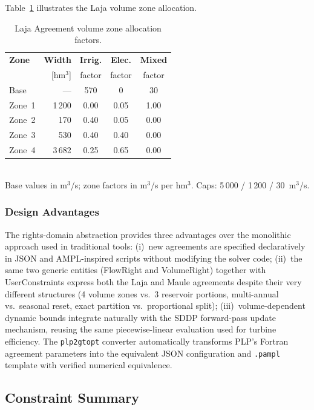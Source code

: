 Table~\ref{tab:laja_zones} illustrates the Laja volume zone
allocation.

\begin{table}[t]
\centering
\caption{Laja Agreement volume zone allocation factors.}
\label{tab:laja_zones}
\small
\begin{tabular}{@{}lrccc@{}}
\toprule
\textbf{Zone} & \textbf{Width} & \textbf{Irrig.}
  & \textbf{Elec.} & \textbf{Mixed} \\
  & [hm$^3$] & factor & factor & factor \\
\midrule
Base       & ---     & 570    & 0      & 30   \\
Zone~1     & 1\,200  & 0.00   & 0.05   & 1.00 \\
Zone~2     & 170     & 0.40   & 0.05   & 0.00 \\
Zone~3     & 530     & 0.40   & 0.40   & 0.00 \\
Zone~4     & 3\,682  & 0.25   & 0.65   & 0.00 \\
\bottomrule
\end{tabular}
\\[4pt]
{\footnotesize Base values in m$^3$/s; zone factors in
m$^3$/s per hm$^3$.  Caps: 5\,000 / 1\,200 / 30~m$^3$/s.}
\end{table}

\subsubsection{Design Advantages}

The rights-domain abstraction provides three advantages over the
monolithic approach used in traditional tools: (i)~new agreements are
specified declaratively in JSON and AMPL-inspired scripts without
modifying the solver code; (ii)~the same two generic entities
(FlowRight and VolumeRight) together with UserConstraints express both
the Laja and Maule agreements despite their very different structures
(4 volume zones vs.\ 3 reservoir portions, multi-annual vs.\ seasonal
reset, exact partition vs.\ proportional split); (iii)~volume-dependent
dynamic bounds integrate naturally with the SDDP forward-pass update
mechanism, reusing the same piecewise-linear evaluation used for
turbine efficiency.  The \texttt{plp2gtopt} converter automatically
transforms PLP's Fortran agreement parameters into the equivalent
\gtopt{} JSON configuration and \texttt{.pampl} template with verified
numerical equivalence.

\subsection{Constraint Summary}

